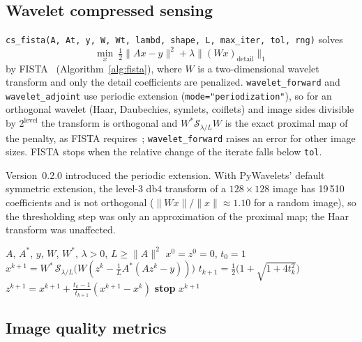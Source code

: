 \documentclass[11pt,a4paper]{article}
\newcommand{\code}[1]{\texttt{#1}}
\begin{document}
\subsection{Wavelet compressed sensing}

\code{cs\_fista(A, At, y, W, Wt, lambd, shape, L, max\_iter, tol, rng)}
solves
\begin{equation}\label{eq:cs}
  \min_x\ \tfrac12\|Ax-y\|^2 + \lambda\|(Wx)_{\mathrm{detail}}\|_1
\end{equation}
by FISTA~\cite{BeckTeboulle2009} (Algorithm~\ref{alg:fista}), where $W$ is a
two-dimensional wavelet transform and only the detail coefficients are
penalized. \code{wavelet\_forward} and \code{wavelet\_adjoint} use periodic
extension (\code{mode="periodization"}), so for an orthogonal wavelet
(Haar, Daubechies, symlets, coiflets) and image sides divisible by
$2^{\text{level}}$ the transform is orthogonal and
$W^*\mathcal S_{\lambda/L}W$ is the exact proximal map of the penalty, as
FISTA requires~\cite{DaubechiesDefriseDeMol2004}; \code{wavelet\_forward}
raises an error for other image sizes. FISTA stops when the
relative change of the iterate falls below \code{tol}.

Version~0.2.0 introduced the periodic extension. With PyWavelets' default
symmetric extension, the level-3 db4 transform of a $128\times128$ image has
19\,510 coefficients and is not orthogonal ($\|Wx\|/\|x\|\approx1.10$ for a
random image), so the
thresholding step was only an approximation of the proximal map; the Haar
transform was unaffected.

\begin{algorithm}[ht]
\caption{FISTA for~\eqref{eq:cs} (\code{cs\_fista})}
\label{alg:fista}
\begin{algorithmic}[1]
\Require $A$, $A^*$, $y$, $W$, $W^*$, $\lambda>0$, $L\ge\|A\|^2$
\State $x^0=z^0=0$, $t_0=1$
\For{$k=0,1,\dots,\code{max\_iter}-1$}
  \State $x^{k+1} = W^*\,\mathcal S_{\lambda/L}\bigl(W(z^k -
  \tfrac1L A^*(Az^k-y))\bigr)$
  \State $t_{k+1} = \tfrac12\bigl(1+\sqrt{1+4t_k^2}\bigr)$
  \State $z^{k+1} = x^{k+1} + \tfrac{t_k-1}{t_{k+1}}(x^{k+1}-x^k)$
  \If{$\|x^{k+1}-x^k\|\le\code{tol}\,\|x^{k+1}\|$} \textbf{stop} \EndIf
\EndFor
\State \Return $x^{k+1}$
\end{algorithmic}
\end{algorithm}

\subsection{Image quality metrics}
\end{document}
